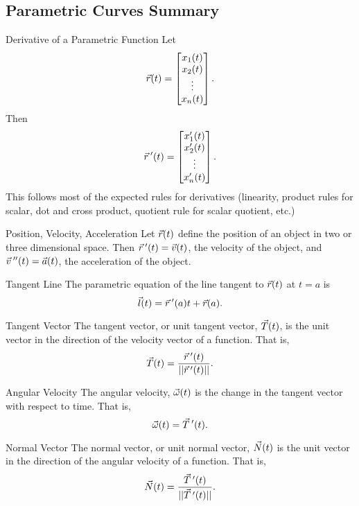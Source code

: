 \renewcommand\thesubsection{\thesection.\Alph{subsection}}
\setcounter{subsection}{18}
\subsection{Parametric Curves Summary}

\begin{definition}{Derivative of a Parametric Function}
Let $$\vec{r}(t)=\begin{bmatrix}x_1(t)\\x_2(t)\\\vdots\\x_n(t)\end{bmatrix}.$$ Then $$\vec{r}\hspace{0.2em}'(t)=\begin{bmatrix}x_1'(t)\\x_2'(t)\\\vdots\\x_n'(t)\end{bmatrix}. $$ This follows most of the expected rules for derivatives (linearity, product rules for scalar, dot and cross product, quotient rule for scalar quotient, etc.)
\end{definition}

\begin{definition}{Position, Velocity, Acceleration}
Let $\vec{r}(t)$ define the position of an object in two or three dimensional space. Then $\vec{r}\hspace{0.2em}'(t)=\vec{v}(t)$, the velocity of the object, and $\vec{v}\hspace{0.2em}''(t)=\vec{a}(t)$, the acceleration of the object.
\end{definition}

\begin{definition}{Tangent Line}
The parametric equation of the line tangent to $\vec{r}(t)$ at $t=a$ is $$\vec{l}(t)=\vec{r}\hspace{0.2em}'(a)t+\vec{r}(a).$$
\end{definition}

\begin{definition}{Tangent Vector}
The tangent vector, or unit tangent vector, $\vec{T}(t)$, is the unit vector in the direction of the velocity vector of a function. That is, $$\vec{T}(t)=\frac{\vec{r}\hspace{0.2em}'(t)}{||\vec{r}\hspace{0.2em}'(t)||}.$$
\end{definition}

\begin{definition}{Angular Velocity}
The angular velocity, $\vec{\omega}(t)$ is the change in the tangent vector with respect to time. That is, $$\vec{\omega}(t)=\vec{T}\hspace{0.2em}'(t).$$
\end{definition}

\begin{definition}{Normal Vector}
The normal vector, or unit normal vector, $\vec{N}(t)$ is the unit vector in the direction of the angular velocity of a function. That is, $$\vec{N}(t)=\frac{\vec{T}\hspace{0.2em}'(t)}{||\vec{T}\hspace{0.2em}'(t)||}. $$
\end{definition}

